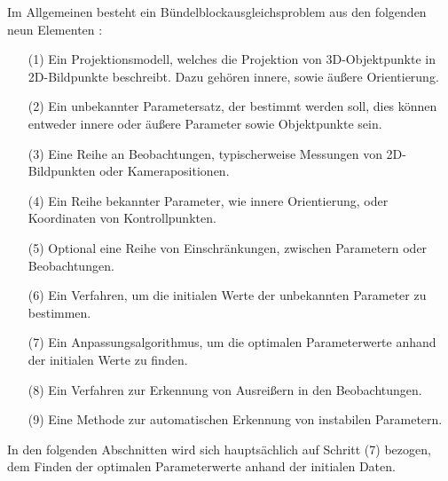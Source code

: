 Im Allgemeinen besteht ein Bündelblockausgleichsproblem aus den folgenden neun Elementen \cite{bundle_adjustment}:

\begin{itemize}
\item[(1)] Ein Projektionsmodell, welches die Projektion von 3D-Objektpunkte in 2D-Bildpunkte beschreibt. Dazu gehören innere, sowie äußere Orientierung.

\item[(2)] Ein unbekannter Parametersatz, der bestimmt werden soll, dies können entweder innere oder äußere Parameter sowie Objektpunkte sein.

\item[(3)] Eine Reihe an Beobachtungen, typischerweise Messungen von 2D-Bildpunkten oder Kamerapositionen.

\item[(4)] Ein Reihe bekannter Parameter, wie innere Orientierung, oder Koordinaten von Kontrollpunkten.

\item[(5)] Optional eine Reihe von Einschränkungen, zwischen Parametern oder Beobachtungen.

\item[(6)] Ein Verfahren, um die initialen Werte der unbekannten Parameter zu bestimmen.

\item[(7)] Ein Anpassungsalgorithmus, um die optimalen Parameterwerte anhand der initialen Werte zu finden.

\item[(8)] Ein Verfahren zur Erkennung von Ausreißern in den Beobachtungen.

\item[(9)] Eine Methode zur automatischen Erkennung von instabilen Parametern.

\end{itemize}

In den folgenden Abschnitten wird sich hauptsächlich auf Schritt (7) bezogen, dem Finden der optimalen Parameterwerte anhand der initialen Daten.

